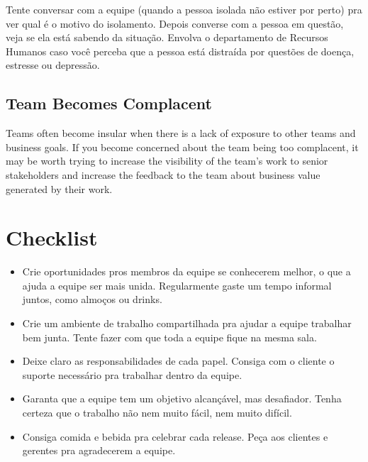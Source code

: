 \documentclass[a4paper, 10pt, font=plain]{abnt}
\begin{document}
Tente conversar com a equipe (quando a pessoa isolada não estiver por perto) pra ver qual é o motivo do isolamento. Depois converse com a pessoa em questão, veja se ela está sabendo da situação. Envolva o departamento de Recursos Humanos caso você perceba que a pessoa está distraída por questões de doença, estresse ou depressão.

\subsection{Team Becomes Complacent}
Teams often become insular when there is a lack of exposure to other
teams and business goals. If you become concerned about the team
being too complacent, it may be worth trying to increase the visibility
of the team’s work to senior stakeholders and increase the feedback to
the team about business value generated by their work.



\section{Checklist}

\begin{itemize}
\item Crie oportunidades pros membros da equipe se conhecerem melhor, o que a ajuda a equipe ser mais unida. Regularmente gaste um tempo informal juntos, como almoços ou drinks.

\item Crie um ambiente de trabalho compartilhada pra ajudar a equipe trabalhar bem junta. Tente fazer com que toda a equipe fique na mesma sala.

\item Deixe claro as responsabilidades de cada papel. Consiga com o cliente o suporte necessário pra trabalhar dentro da equipe.

\item Garanta que a equipe tem um objetivo alcançável, mas desafiador. Tenha certeza que o trabalho não nem muito fácil, nem muito difícil.

\item Consiga comida e bebida pra celebrar cada release. Peça aos clientes e gerentes pra agradecerem a equipe.

\end{itemize}
\end{document}

